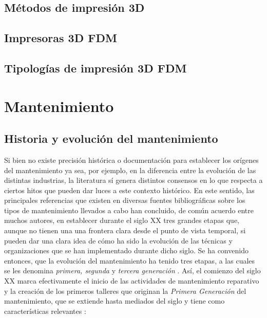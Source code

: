 \subsection{Métodos de impresión 3D}

\subsection{Impresoras 3D FDM}

\subsection{Tipologías de impresión 3D FDM}

\section{Mantenimiento}

\subsection{Historia y evolución del mantenimiento}

Si bien no existe precisión histórica o documentación para establecer los orígenes del mantenimiento ya sea, por ejemplo, en la diferencia entre la evolución de las distintas industrias, la literatura sí genera distintos consensos en lo que respecta a ciertos hitos que pueden dar luces a este contexto histórico. En este sentido, las principales referencias que existen en diversas fuentes bibliográficas sobre los tipos de mantenimiento llevados a cabo han concluido, de común acuerdo entre muchos autores, en establecer durante el siglo XX tres grandes etapas que, aunque no tienen una una frontera clara desde el punto de vista temporal, si pueden dar una clara idea de cómo ha sido la evolución de las técnicas y organizaciones que se han implementado durante dicho siglo. Se ha convenido entonces, que la evolución del mantenimiento ha tenido tres etapas, a las cuales se les denomina \textit{primera, segunda} y \textit{tercera generación} \citep{gonzalez2005}.
Así, el comienzo del siglo XX marca efectivamente el inicio de las actividades de mantenimiento reparativo y la creación de los primeros talleres que originan la \textit{Primera Generación} del mantenimiento, que se extiende hasta mediados del siglo y tiene como características relevantes \citep{garcia2012}:

